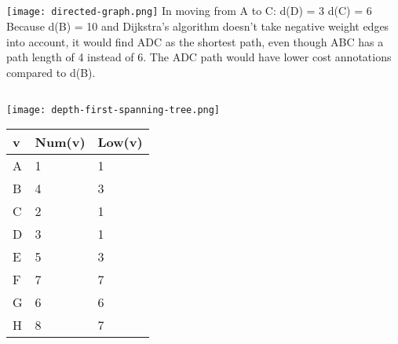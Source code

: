 \documentclass{article}
\begin{document}
\subsection{}
\texttt{[image: directed-graph.png]}
\newline
In moving from A to C:
\newline
d(D) = 3
\newline
d(C) = 6
\newline
Because d(B) = 10 and Dijkstra's algorithm doesn't take negative weight edges into account, it would find ADC as the shortest path, even though ABC has a path length of 4 instead of 6. The ADC path would have lower cost annotations compared to d(B).

\subsection{}
\texttt{[image: depth-first-spanning-tree.png]}
\newline
\begin{table}[h]
\centering
\begin{tabular}{|l|l|l|}
\hline
v & Num(v) & Low(v) \\ \hline
A & 1 & 1 \\ \hline
B & 4 & 3 \\ \hline
C & 2 & 1 \\ \hline
D & 3 & 1 \\ \hline
E & 5 & 3 \\ \hline
F & 7 & 7 \\ \hline
G & 6 & 6 \\ \hline
H & 8 & 7 \\ \hline
\end{tabular}
\end{table}
\end{document}
